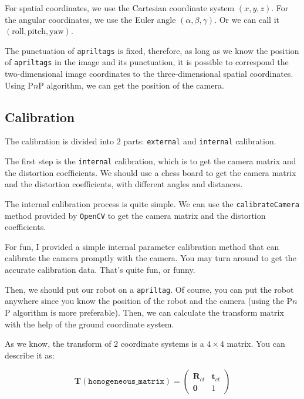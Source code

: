 \documentclass{article}
\begin{document}
For spatial coordinates, we use the Cartesian coordinate system $\left(x,y,z\right)$. For the angular coordinates, we use the Euler angle $\left(\alpha,\beta,\gamma\right)$. Or we can call it $\left(\mathrm{roll},\mathrm{pitch},\mathrm{yaw}\right)$.

The punctuation of \texttt{apriltags} is fixed, therefore, as long as we know the position of \texttt{apriltags} in the image and its punctuation, it is possible to correspond the two-dimensional image coordinates to the three-dimensional spatial coordinates. Using P$n$P algorithm, we can get the position of the camera.

\subsection{Calibration}

The calibration is divided into $2$ parts: \texttt{external} and \texttt{internal} calibration.

The first step is the \texttt{internal} calibration, which is to get the camera matrix and the distortion coefficients. We should use a chess board to get the camera matrix and the distortion coefficients, with different angles and distances.

The internal calibration process is quite simple. We can use the \texttt{calibrateCamera} method provided by \texttt{OpenCV} to get the camera matrix and the distortion coefficients.

For fun, I provided a simple internal parameter calibration method that can calibrate the camera promptly with the camera. You may turn around to get the accurate calibration data. That's quite fun, or funny.

Then, we should put our robot on a \texttt{apriltag}. Of course, you can put the robot anywhere since you know the position of the robot and the camera (using the P$n$P algorithm is more preferable). Then, we can calculate the transform matrix with the help of the ground coordinate system.

As we know, the transform of $2$ coordinate systems is a $4\times4$ matrix. You can describe it as:

\begin{equation}
  \boldsymbol{T} (\texttt{homogeneous\_matrix})=\left(
    \begin{matrix}
      \boldsymbol{R}_{ct} & \boldsymbol{t}_{ct} \\
      \boldsymbol{0} & 1
    \end{matrix}
  \right)
\end{equation}
\end{document}
